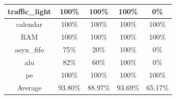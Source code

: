 \begin{tabular}{c|cc|cc}
traffic\_light & \color{black} {\cellcolor{lightblue}} 100\% & \color{black} {\cellcolor{lightgreen}} 100\% & \color{black} {\cellcolor{lightblue}} 100\% & 0\% \\ \midrule
calendar & \color{black} {\cellcolor{lightblue}} 100\% & \color{black} {\cellcolor{lightgreen}} 100\% & \color{black} {\cellcolor{lightblue}} 100\% & \color{black} {\cellcolor{lightgreen}} 100\% \\ \midrule
RAM & \color{black} {\cellcolor{lightblue}} 100\% & \color{black} {\cellcolor{lightgreen}} 100\% & \color{black} {\cellcolor{lightblue}} 100\% & \color{black} {\cellcolor{lightgreen}} 100\% \\ \midrule
asyn\_fifo & 75\% & \color{black} {\cellcolor{lightgreen}} 20\% & \color{black} {\cellcolor{lightblue}} 100\% & 0\% \\ \midrule
alu & 82\% & \color{black} {\cellcolor{lightgreen}} 60\% & \color{black} {\cellcolor{lightblue}} 100\% & 0\% \\ \midrule
pe & \color{black} {\cellcolor{lightblue}} 100\% & \color{black} {\cellcolor{lightgreen}} 100\% & \color{black} {\cellcolor{lightblue}} 100\% & \color{black} {\cellcolor{lightgreen}} 100\% \\ \midrule
Average & \color{black} {\cellcolor{lightblue}} 93.80\% & \color{black} {\cellcolor{lightgreen}} 88.97\% & 93.69\% & 65.17\% \\
\bottomrule
\end{tabular}
